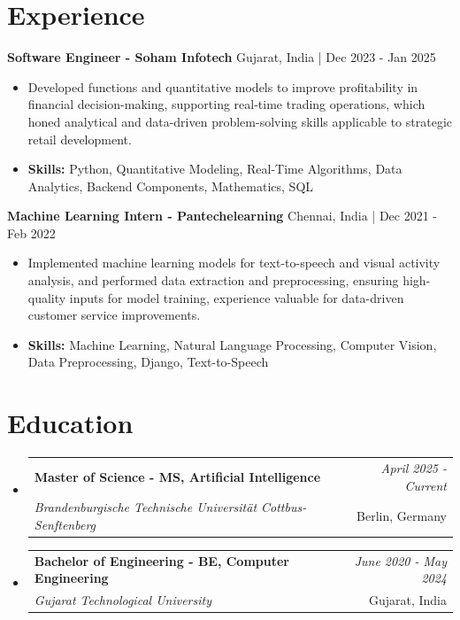\documentclass[a4paper,11pt]{article}
\makeatletter
\newcommand{\resumeSubheading}[4]{
\vspace{0.5mm}\item
    \begin{tabular*}{0.98\textwidth}[t]{l@{\extracolsep{\fill}}r}
        \textbf{#1} & \textit{\footnotesize{#4}} \\
        \textit{\footnotesize{#3}} &  \footnotesize{#2}\\
    \end{tabular*}
    \vspace{-2.4mm}
}
\makeatother
\begin{document}
\section{\textbf{Experience}}


\vspace{1mm}
  \textbf{Software Engineer - Soham Infotech} \hfill Gujarat, India | Dec 2023 - Jan 2025
\vspace{-1.5mm} %
\begin{itemize}
  \item Developed functions and quantitative models to improve profitability in financial decision-making, supporting real-time trading operations, which honed analytical and data-driven problem-solving skills applicable to strategic retail development.

\vspace{-2mm}
  \item \textbf{Skills:} Python, Quantitative Modeling, Real-Time Algorithms, Data Analytics, Backend Components, Mathematics, SQL
\end{itemize}

\vspace{1mm}
  \textbf{Machine Learning Intern - Pantechelearning} \hfill Chennai, India | Dec 2021 - Feb 2022
\vspace{-1.5mm} %
\begin{itemize}
  \item Implemented machine learning models for text-to-speech and visual activity analysis, and performed data extraction and preprocessing, ensuring high-quality inputs for model training, experience valuable for data-driven customer service improvements.
\vspace{-2mm}
  \item \textbf{Skills:} Machine Learning, Natural Language Processing, Computer Vision, Data Preprocessing, Django, Text-to-Speech
\end{itemize}\section{\textbf{Education}}
\vspace{-0.4mm}

\begin{itemize}
\resumeSubheading
{Master of Science - MS, Artificial Intelligence }{Berlin, Germany}
{Brandenburgische Technische Universität Cottbus-Senftenberg  }{April 2025 - Current}

\vspace{1.0mm} %
\resumeSubheading
{Bachelor of Engineering - BE, Computer Engineering  }{Gujarat, India}
{Gujarat Technological University }{June 2020 - May 2024}

\end{itemize}
\end{document}
